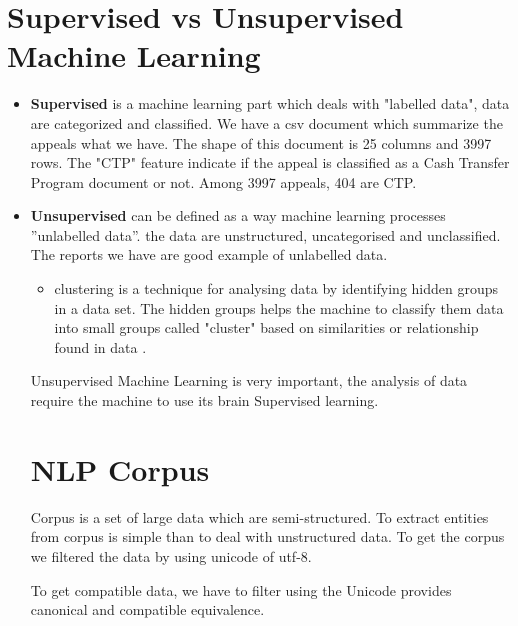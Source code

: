 \section{Supervised vs Unsupervised  Machine Learning}
\begin{itemize}
\item \textbf{Supervised} is a machine learning part which deals with "labelled data",  data are categorized and classified. We have a csv document which summarize the appeals what we have. The shape of this document is 25 columns and 3997 rows. The "CTP" feature indicate if the appeal is classified as a Cash
Transfer Program document  or not. Among 3997 appeals, 404 are CTP. 

\item \textbf{Unsupervised} can be defined as a way machine learning processes ”unlabelled data”.
the data are unstructured, uncategorised and unclassified. The reports we have are good example of unlabelled data.
\begin{itemize}
\item clustering is a technique for analysing data by identifying hidden groups in a data set. The hidden groups helps the machine to  classify them data into small groups called "cluster" based on similarities or relationship found in data \citep{dy2004feature}.
\end{itemize}
Unsupervised Machine Learning is very important, the analysis of data require the machine to use its brain Supervised learning.
\section{NLP Corpus}\label{re}
Corpus is a set of large data which are semi-structured.  To extract entities from corpus is simple than to deal with unstructured data. To get the corpus we filtered the data by using unicode of utf-8.

To get compatible data, we have to filter using the Unicode provides canonical and compatible equivalence.



\end{itemize}
